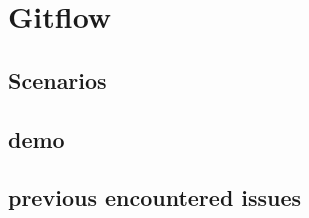 

\section{Gitflow}
	

	\subsection{Scenarios}
	

	\subsection{demo}
	

	\subsection{previous encountered issues}
	
